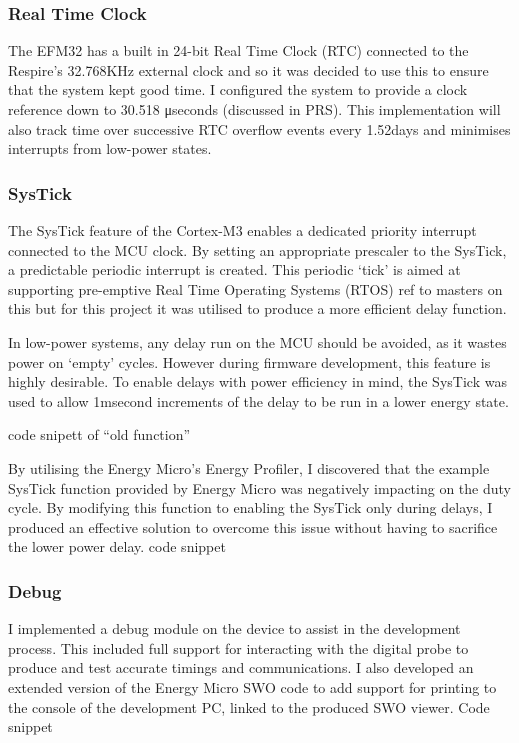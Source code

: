 \subsubsection{Real Time Clock}
The EFM32 has a built in 24-bit Real Time Clock (RTC) connected to the Respire’s 32.768KHz external
clock and so it was decided to use this to ensure that the system kept good time. I configured the
system to provide a clock reference down to 30.518 μseconds (discussed in PRS). This
implementation will also track time over successive RTC overflow events every 1.52days and
minimises interrupts from low-power states.


\subsubsection{SysTick}
The SysTick feature of the Cortex-M3 enables a dedicated priority interrupt connected to the MCU
clock. By setting an appropriate prescaler to the SysTick, a predictable periodic interrupt is created.
This periodic ‘tick’ is aimed at supporting pre-emptive Real Time Operating Systems (RTOS) {ref to
masters on this} but for this project it was utilised to produce a more efficient delay function.


In low-power systems, any delay run on the MCU should be avoided, as it wastes power on ‘empty’
cycles. However during firmware development, this feature is highly desirable. To enable delays with
power efficiency in mind, the SysTick was used to allow 1msecond increments of the delay to be run
in a lower energy state.


{code snipett of “old function”}


By utilising the Energy Micro’s Energy Profiler, I discovered that the example SysTick function
provided by Energy Micro was negatively impacting on the duty cycle. By modifying this function to
enabling the SysTick only during delays, I produced an effective solution to overcome this issue
without having to sacrifice the lower power delay.
{code snippet }

\subsubsection{Debug}
I implemented a debug module on the device to assist in the development process. This included full
support for interacting with the digital probe to produce and test accurate timings and
communications. I also developed an extended version of the Energy Micro SWO code to add
support for printing to the console of the development PC, linked to the produced SWO viewer.
Code snippet

